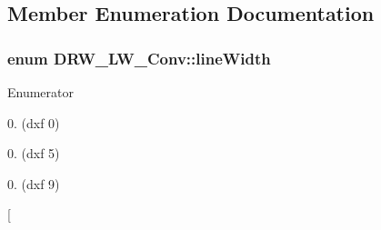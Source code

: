 \subsection{Member Enumeration Documentation}
\hypertarget{class_d_r_w___l_w___conv_aed68cbc3d8bdf7e20003dd2d970279b3}{}
\subsubsection[{line\+Width}]{\setlength{\rightskip}{0pt plus 5cm}enum {\bf D\+R\+W\+\_\+\+L\+W\+\_\+\+Conv\+::line\+Width}}\label{class_d_r_w___l_w___conv_aed68cbc3d8bdf7e20003dd2d970279b3}
\begin{Desc}
\item[Enumerator]\par
\begin{description}
\item[{\em 
\hypertarget{class_d_r_w___l_w___conv_aed68cbc3d8bdf7e20003dd2d970279b3a3007c229abfe3c9f018b2a881384aa17}{}width00\label{class_d_r_w___l_w___conv_aed68cbc3d8bdf7e20003dd2d970279b3a3007c229abfe3c9f018b2a881384aa17}
}]0.\+00mm (dxf 0) \item[{\em 
\hypertarget{class_d_r_w___l_w___conv_aed68cbc3d8bdf7e20003dd2d970279b3a27fc91eb33b8254bd0d0fbbb4b9430cc}{}width01\label{class_d_r_w___l_w___conv_aed68cbc3d8bdf7e20003dd2d970279b3a27fc91eb33b8254bd0d0fbbb4b9430cc}
}]0.\+05mm (dxf 5) \item[{\em 
\hypertarget{class_d_r_w___l_w___conv_aed68cbc3d8bdf7e20003dd2d970279b3aa85257cc5f5a011103273232c4f90822}{}width02\label{class_d_r_w___l_w___conv_aed68cbc3d8bdf7e20003dd2d970279b3aa85257cc5f5a011103273232c4f90822}
}]0.\+09mm (dxf 9) \item[{\em 
}
\end{description}
\end{Desc}
